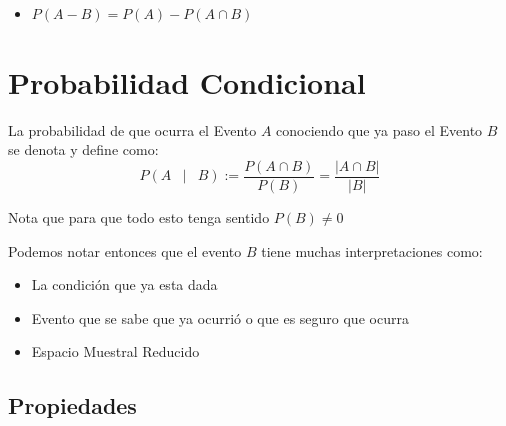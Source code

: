 \documentclass[12pt, fleqn]{report}                             %
\DeclareMathOperator \Space {\quad}                             %
\DeclareMathOperator \MiniSpace {\;}                            %
\newcommand \Such {\MiniSpace | \MiniSpace}                     %
\theoremstyle{break}                                            %
\newcommand{\Wrap}[1]{\left( #1 \right)}                        %
\newcommand{\Mag}[1]{\left| #1 \right|}                         %
\begin{document}
\begin{itemize}
                    \item
                        $P(A - B) = P(A) - P(A \cap B)$

                \end{itemize}

     

        \clearpage
        \section{Probabilidad Condicional}

            La probabilidad de que ocurra el Evento $A$ conociendo que ya paso
            el Evento $B$ se denota y define como:
            \begin{equation*}
                P \Wrap{ A \Such B}
                    := \frac{P(A \cap B)}{P(B)}
                    = \frac{\Mag{A \cap B}}{\Mag{B}}
            \end{equation*}

            Nota que para que todo esto tenga sentido $P(B) \neq 0$

            Podemos notar entonces que el evento $B$ tiene muchas interpretaciones
            como:
            \begin{itemize}
                \item La condición que ya esta dada
                \item Evento que se sabe que ya ocurrió o que es seguro que ocurra
                \item Espacio Muestral Reducido
            \end{itemize}


            \clearpage
            \subsection{Propiedades}
\end{document}
